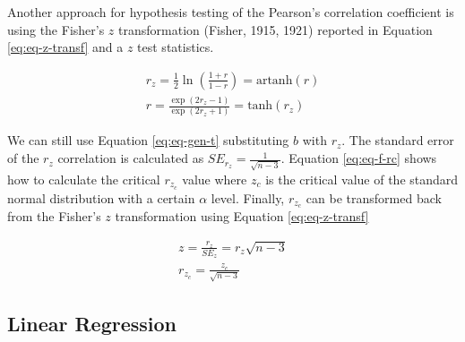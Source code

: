 \documentclass[
  man]{apa7}
\begin{document}
Another approach for hypothesis testing of the Pearson's correlation coefficient is using the Fisher's \(z\) transformation (Fisher, 1915, 1921) reported in Equation \eqref{eq:eq-z-transf} and a \(z\) test statistics.

\begin{equation}
    \label{eq:eq-z-transf}
    \begin{gathered}
    r_z = \frac{1}{2} \ln \left(\frac{1 + r}{1 - r} \right) =                   \text{artanh}(r) \\
    r = \frac{\exp(2r_z - 1)}{\exp(2r_z + 1)} = \text{tanh}(r_z)
    \end{gathered}
\end{equation}

We can still use Equation \eqref{eq:eq-gen-t} substituting \(b\) with \(r_z\). The standard error of the \(r_z\) correlation is calculated as \(SE_{r_z} = \frac{1}{\sqrt{n - 3}}\). Equation \eqref{eq:eq-f-rc} shows how to calculate the critical \(r_{z_c}\) value where \(z_c\) is the critical value of the standard normal distribution with a certain \(\alpha\) level. Finally, \(r_{z_c}\) can be transformed back from the Fisher's \(z\) transformation using Equation \eqref{eq:eq-z-transf}

\begin{equation}
    \label{eq:eq-f-rc}
    \begin{gathered}
        z = \frac{r_z}{SE_z} = r_z \sqrt{n - 3} \\
        r_{z_c} = \frac{z_c}{\sqrt{n - 3}}
    \end{gathered}
\end{equation}

\hypertarget{linear-regression}{%
\subsection{Linear Regression}\label{linear-regression}}
\end{document}

